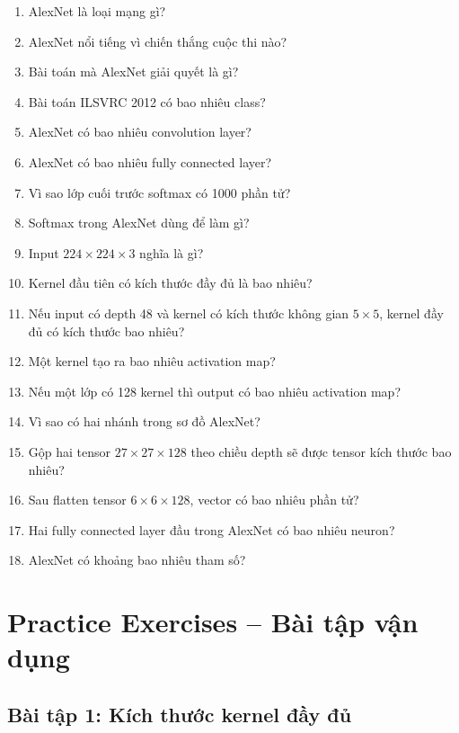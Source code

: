 \begin{enumerate}
    \item AlexNet là loại mạng gì?
    \item AlexNet nổi tiếng vì chiến thắng cuộc thi nào?
    \item Bài toán mà AlexNet giải quyết là gì?
    \item Bài toán ILSVRC 2012 có bao nhiêu class?
    \item AlexNet có bao nhiêu convolution layer?
    \item AlexNet có bao nhiêu fully connected layer?
    \item Vì sao lớp cuối trước softmax có 1000 phần tử?
    \item Softmax trong AlexNet dùng để làm gì?
    \item Input $224\times224\times3$ nghĩa là gì?
    \item Kernel đầu tiên có kích thước đầy đủ là bao nhiêu?
    \item Nếu input có depth 48 và kernel có kích thước không gian $5\times5$, kernel đầy đủ có kích thước bao nhiêu?
    \item Một kernel tạo ra bao nhiêu activation map?
    \item Nếu một lớp có 128 kernel thì output có bao nhiêu activation map?
    \item Vì sao có hai nhánh trong sơ đồ AlexNet?
    \item Gộp hai tensor $27\times27\times128$ theo chiều depth sẽ được tensor kích thước bao nhiêu?
    \item Sau flatten tensor $6\times6\times128$, vector có bao nhiêu phần tử?
    \item Hai fully connected layer đầu trong AlexNet có bao nhiêu neuron?
    \item AlexNet có khoảng bao nhiêu tham số?
\end{enumerate}

\section{Practice Exercises -- Bài tập vận dụng}

\subsection*{Bài tập 1: Kích thước kernel đầy đủ}

